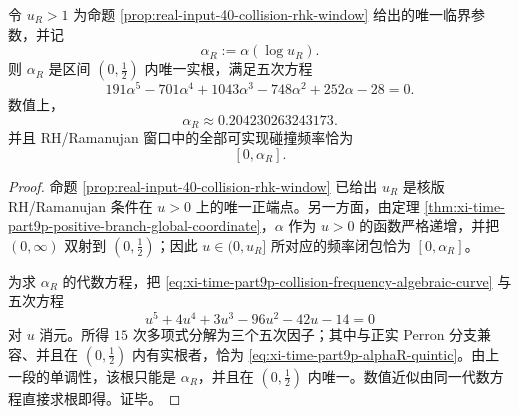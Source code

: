 \begin{corollary}\label{cor:xi-time-part9p-rh-window-frequency-endpoint}
令 \(u_R>1\) 为命题 \ref{prop:real-input-40-collision-rhk-window} 给出的唯一临界参数，并记
\[
\alpha_R:=\alpha(\log u_R).
\]
则 \(\alpha_R\) 是区间 \((0,\tfrac12)\) 内唯一实根，满足五次方程
\begin{equation}\label{eq:xi-time-part9p-alphaR-quintic}
191\alpha^5-701\alpha^4+1043\alpha^3-748\alpha^2+252\alpha-28=0.
\end{equation}
数值上，
\[
\alpha_R\approx 0.204230263243173.
\]
并且 RH/Ramanujan 窗口中的全部可实现碰撞频率恰为
\[
[0,\alpha_R].
\]
\end{corollary}
\begin{proof}
命题 \ref{prop:real-input-40-collision-rhk-window} 已给出 \(u_R\) 是核版 RH/Ramanujan 条件在 \(u>0\) 上的唯一正端点。另一方面，由定理
\ref{thm:xi-time-part9p-positive-branch-global-coordinate}，\(\alpha\) 作为 \(u>0\) 的函数严格递增，并把 \((0,\infty)\) 双射到 \((0,\tfrac12)\)；因此 \(u\in(0,u_R]\) 所对应的频率闭包恰为 \([0,\alpha_R]\)。

为求 \(\alpha_R\) 的代数方程，把
\eqref{eq:xi-time-part9p-collision-frequency-algebraic-curve} 与五次方程
\[
u^5+4u^4+3u^3-96u^2-42u-14=0
\]
对 \(u\) 消元。所得 \(15\) 次多项式分解为三个五次因子；其中与正实 Perron 分支兼容、并且在 \((0,\tfrac12)\) 内有实根者，恰为
\eqref{eq:xi-time-part9p-alphaR-quintic}。由上一段的单调性，该根只能是 \(\alpha_R\)，并且在 \((0,\tfrac12)\) 内唯一。数值近似由同一代数方程直接求根即得。证毕。
\end{proof}

